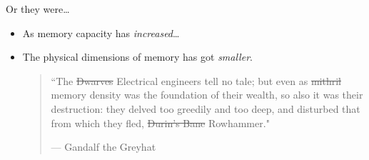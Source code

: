 \documentclass[9pt,aspectratio=169]{beamer}
\begin{document}
\begin{frame}[label={sec:org14f8436}]{Or they were\ldots{}}
\begin{itemize}
\item As memory capacity has \emph{increased}\ldots{}
\item The physical dimensions of memory has got \emph{smaller}.

\vfill
\begin{quote}
``The \sout{Dwarves} \alert{Electrical engineers} tell no tale; but even as \sout{mithril}
\alert{memory density} was the foundation of their wealth, so also it was
their destruction: they delved too greedily and too deep, and
disturbed that from which they fled, \sout{Durin's Bane} \alert{Rowhammer}."

--- \alert{Gandalf the Greyhat}
\end{quote}
\end{itemize}
\end{frame}
\end{document}
